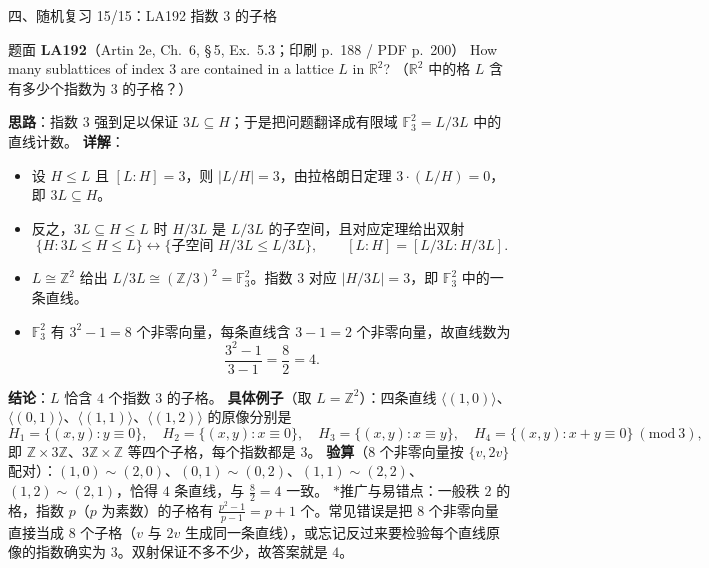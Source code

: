 \documentclass[aspectratio=169,10pt,fontset=none]{ctexbeamer}
\newcommand{\ex}[1]{\textcolor{accent}{\footnotesize\bfseries #1}}
\newcommand{\key}[1]{\textcolor{ink}{\bfseries #1}}
\newcommand{\starpt}{\textcolor{accent}{\bfseries$\ast$}}
\begin{document}
\begin{frame}[t]{四、随机复习 15/15：LA192 指数 $3$ 的子格}
\label{ex:LA192}
\scriptsize
\begin{block}{\footnotesize 题面 \ex{LA192}（Artin 2e, Ch.~6, \S\,5, Ex.~5.3；印刷 p.~188 / PDF p.~200）}
How many sublattices of index $3$ are contained in a lattice $L$ in $\mathbb R^2$?
（$\mathbb R^2$ 中的格 $L$ 含有多少个指数为 $3$ 的子格？）
\end{block}
\key{思路}：指数 $3$ 强到足以保证 $3L\subseteq H$；于是把问题翻译成有限域 $\mathbb F_3^2=L/3L$ 中的直线计数。
\key{详解}：
\begin{itemize}\setlength{\itemsep}{1pt}\setlength{\parsep}{0pt}
\item 设 $H\le L$ 且 $[L:H]=3$，则 $|L/H|=3$，由拉格朗日定理 $3\cdot(L/H)=0$，即 $3L\subseteq H$。
\item 反之，$3L\subseteq H\le L$ 时 $H/3L$ 是 $L/3L$ 的子空间，且对应定理给出双射
\[ \{H:3L\le H\le L\}\longleftrightarrow\{\text{子空间 }H/3L\le L/3L\},\qquad
[L:H]=[L/3L:H/3L]. \]
\item $L\cong\mathbb Z^2$ 给出 $L/3L\cong(\mathbb Z/3)^2=\mathbb F_3^2$。指数 $3$ 对应 $|H/3L|=3$，即 $\mathbb F_3^2$ 中的一条直线。
\item $\mathbb F_3^2$ 有 $3^2-1=8$ 个非零向量，每条直线含 $3-1=2$ 个非零向量，故直线数为
\[ \frac{3^2-1}{3-1}=\frac82=4 . \]
\end{itemize}
\key{结论}：$L$ 恰含 $4$ 个指数 $3$ 的子格。
\key{具体例子}（取 $L=\mathbb Z^2$）：四条直线 $\langle(1,0)\rangle$、$\langle(0,1)\rangle$、$\langle(1,1)\rangle$、$\langle(1,2)\rangle$ 的原像分别是
\[
H_1=\{(x,y):y\equiv0\},\quad H_2=\{(x,y):x\equiv0\},\quad H_3=\{(x,y):x\equiv y\},\quad H_4=\{(x,y):x+y\equiv0\}\ (\mathrm{mod}\ 3),
\]
即 $\mathbb Z\times3\mathbb Z$、$3\mathbb Z\times\mathbb Z$ 等四个子格，每个指数都是 $3$。
\key{验算}（$8$ 个非零向量按 $\{v,2v\}$ 配对）：$(1,0)\sim(2,0)$、$(0,1)\sim(0,2)$、$(1,1)\sim(2,2)$、$(1,2)\sim(2,1)$，恰得 $4$ 条直线，与 $\frac82=4$ 一致。
\starpt 推广与易错点：一般秩 $2$ 的格，指数 $p$（$p$ 为素数）的子格有 $\frac{p^2-1}{p-1}=p+1$ 个。常见错误是把 $8$ 个非零向量直接当成 $8$ 个子格（$v$ 与 $2v$ 生成同一条直线），或忘记反过来要检验每个直线原像的指数确实为 $3$。双射保证不多不少，故答案就是 $4$。
\end{frame}

\end{document}
